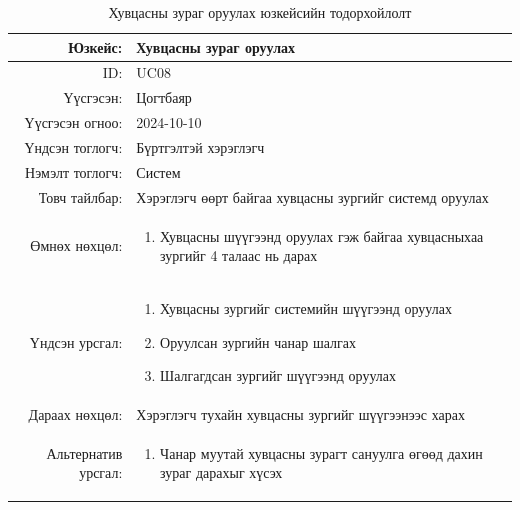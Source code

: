 \begin{longtable}{|r|p{11.5cm}|}
    \caption{Хувцасны зураг оруулах юзкейсийн тодорхойлолт} 
    \label{table:songolt3}\\ \hline
    {Юзкейс:} & {Хувцасны зураг оруулах}\\ \hline
    {ID:} & {UC08}\\ \hline
    {Үүсгэсэн:} & {Цогтбаяр}\\ \hline
    {Үүсгэсэн огноо:} & {2024-10-10}\\ \hline
    {Үндсэн тоглогч:} & {Бүртгэлтэй хэрэглэгч}\\ \hline
    {Нэмэлт тоглогч:} & {Систем}\\ \hline
    {Товч тайлбар:} & {Хэрэглэгч өөрт байгаа  хувцасны зургийг системд оруулах }\\ \hline
    {Өмнөх нөхцөл:} & {\begin{enumerate}
        \item Хувцасны шүүгээнд оруулах гэж байгаа хувцасныхаа зургийг 4 талаас нь дарах
    \end{enumerate}}\\ \hline
    {Үндсэн урсгал:} & {\begin{enumerate}
        \item Хувцасны зургийг системийн шүүгээнд оруулах 
    \item Оруулсан зургийн чанар шалгах
    \item Шалгагдсан зургийг шүүгээнд оруулах\end{enumerate}}\\ \hline
    {Дараах нөхцөл:} & {Хэрэглэгч тухайн хувцасны зургийг шүүгээнээс харах}\\ \hline
    {Альтернатив урсгал:} & {\begin{enumerate}
        \item Чанар муутай хувцасны зурагт сануулга өгөөд дахин зураг дарахыг хүсэх
    \end{enumerate}}\\ \hline
\end{longtable}
\newpage
